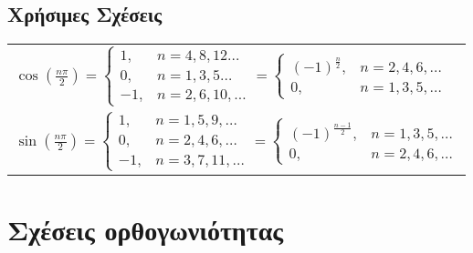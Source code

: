 \section*{Χρήσιμες Σχέσεις}


{
\renewcommand{\arraystretch}{4.5}
\begin{tabular}{l}
  $ \cos{\left(\frac{n \pi}{2}\right)} = 
  \begin{cases}
    1, & n=4,8,12\ldots \\
    0, & n=1,3,5\ldots \\
    -1, & n=2,6,10,\ldots 
  \end{cases} =
  \begin{cases}
    (-1)^{\frac{n}{2}}, & n = 2,4,6,\ldots \\
    0, & n = 1,3,5,\ldots
  \end{cases} $ \\
  $ \sin{\left(\frac{n \pi}{2}\right)} = 
  \begin{cases}
    1, & n=1,5,9,\ldots \\
    0, & n=2,4,6,\ldots \\
    -1, & n=3,7,11,\ldots 
  \end{cases} =
  \begin{cases}
    (-1)^{\frac{n-1}{2}}, & n = 1,3,5,\ldots \\
    0, & n = 2,4,6,\ldots
  \end{cases} $
\end{tabular}
}


\chapter*{Σχέσεις ορθογωνιότητας}

